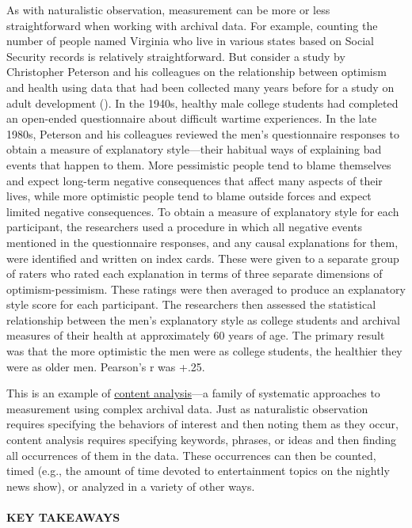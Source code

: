 \documentclass[
]{krantz}
\begin{document}
As with naturalistic observation, measurement can be more or less straightforward when working with archival data. For example, counting the number of people named Virginia who live in various states based on Social Security records is relatively straightforward. But consider a study by Christopher Peterson and his colleagues on the relationship between optimism and health using data that had been collected many years before for a study on adult development (). In the 1940s, healthy male college students had completed an open-ended questionnaire about difficult wartime experiences. In the late 1980s, Peterson and his colleagues reviewed the men's questionnaire responses to obtain a measure of explanatory style---their habitual ways of explaining bad events that happen to them. More pessimistic people tend to blame themselves and expect long-term negative consequences that affect many aspects of their lives, while more optimistic people tend to blame outside forces and expect limited negative consequences. To obtain a measure of explanatory style for each participant, the researchers used a procedure in which all negative events mentioned in the questionnaire responses, and any causal explanations for them, were identified and written on index cards. These were given to a separate group of raters who rated each explanation in terms of three separate dimensions of optimism-pessimism. These ratings were then averaged to produce an explanatory style score for each participant. The researchers then assessed the statistical relationship between the men's explanatory style as college students and archival measures of their health at approximately 60 years of age. The primary result was that the more optimistic the men were as college students, the healthier they were as older men. Pearson's r was +.25.

This is an example of \hyperref[content-analysis]{content analysis}---a family of systematic approaches to measurement using complex archival data. Just as naturalistic observation requires specifying the behaviors of interest and then noting them as they occur, content analysis requires specifying keywords, phrases, or ideas and then finding all occurrences of them in the data. These occurrences can then be counted, timed (e.g., the amount of time devoted to entertainment topics on the nightly news show), or analyzed in a variety of other ways.

\paragraph*{KEY TAKEAWAYS}\label{key-takeaways-19}
\end{document}
